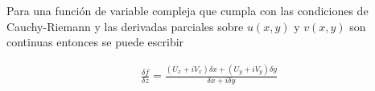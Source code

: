     Para una función de variable compleja que cumpla con las condiciones de Cauchy-Riemann y las derivadas parciales sobre $u(x,y)$ y $v(x,y)$ son continuas entonces se puede escribir

    \begin{gather*}
        \frac{\delta f}{\delta z} = \frac{(U_x + iV_x)\delta x + (U_y + iV_y)\delta y}{\delta x + i\delta y}
    \end{gather*}

    



